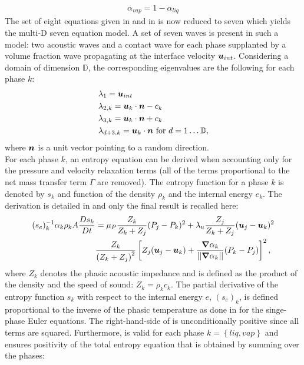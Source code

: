 %
\begin{align}
 \alpha_{vap}= 1 - \alpha_{liq}
\end{align}
%
The set of eight equations given in  and in  is now reduced to seven which yields the multi-D seven equation model. A set of seven waves is present in such a model: two acoustic waves and a contact wave for each phase supplanted by a volume fraction wave propagating at the interface velocity $\boldsymbol u_{int}$. Considering a domain of dimension $\mathbb{D}$, the corresponding eigenvalues are the following for each phase $k$:
% 
\begin{align}
&\lambda_1 = \boldsymbol u_{int} \nonumber\\
&\lambda_{2,k} = \boldsymbol u_k \cdot \boldsymbol n - c_k \nonumber\\
&\lambda_{3,k} = \boldsymbol u_k \cdot \boldsymbol n + c_k \nonumber\\
&\lambda_{d+3,k} = \boldsymbol u_k \cdot \boldsymbol n \text{ for } d = 1 \dots \mathbb{D},\nonumber
\end{align}
%
where $\boldsymbol n$ is a unit vector pointing to a random direction. \\
For each phase $k$, an entropy equation can be derived when accounting only for the pressure and velocity relaxation terms (all of the terms proportional to the net mass transfer term $\Gamma$ are removed). The entropy function for a phase $k$ is denoted by $s_k$ and function of the density $\rho_k$ and the internal energy $e_k$. The derivation is detailed in  and only the final result is recalled here:
%
\begin{align}\label{eq:ent-eqn-7-eqn-model}
(s_{e})_k^{-1} \alpha_k \rho_k A \frac{Ds_k}{Dt} &= \mu_P \frac{Z_k}{Z_k+Z_j} (P_j - P_k)^2 + \lambda_u \frac{Z_j}{Z_k+Z_j} (\boldsymbol u_j -\boldsymbol u_k)^2 \nonumber
\\
& \frac{Z_k}{\left( Z_k+Z_j \right)^2} \left[ Z_j (\boldsymbol u_j-\boldsymbol u_k)+\frac{\boldsymbol{\nabla} \alpha_k}{|| \boldsymbol{\nabla} \alpha_k ||}(P_k-P_j)\right]^2,
\end{align}
where $Z_{k}$ denotes the phasic acoustic impedance and is defined as the product of the density and the speed of sound: $Z_k = \rho_k c_k$. The partial derivative of the entropy function $s_k$ with respect to the internal energy $e$, $(s_e)_k$, is defined proportional to the inverse of the phasic temperature as done in  for the singe-phase Euler equations. The right-hand-side of  is unconditionally positive since all terms are squared. Furthermore,  is valid for each phase $k=\left\{liq, vap \right\}$ and ensures positivity of the total entropy equation that is obtained by summing over the phases:
